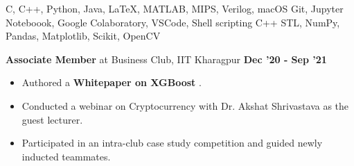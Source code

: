 \documentclass[10pt]{article}
\begin{document}
\vspace{-1.5ex}
{\color{headliner} \spacedhrule{0.15ex}{1.0ex}}
\begingroup
    \fontsize{10pt}{12pt}\selectfont
    \vspace{-0.7ex}
	{C,\hspace{0.75ex} 
	C++,\hspace{0.75ex}  Python,\hspace{0.75ex}
	Java, \hspace{0.75ex}
	LaTeX, \hspace{0.75ex}
	MATLAB, \hspace{0.75ex}
	MIPS, \hspace{0.75ex}
	Verilog, \hspace{0.75ex}
	macOS}
	\vspace{-0.7ex}
	{Git,\hspace{0.75ex} Jupyter Noteboook,\hspace{0.75ex} Google Colaboratory,\hspace{0.75ex} VSCode,\hspace{0.75ex} Shell scripting}
	\vspace{-0.7ex}
    {C++ STL,\hspace{0.75ex} NumPy,\hspace{0.75ex} Pandas,\hspace{0.75ex} Matplotlib,\hspace{0.75ex} Scikit,\hspace{0.75ex} OpenCV}
\endgroup

\vspace{-0.1ex}
{\color{headliner} \spacedhrule{0.15ex}{2.0ex}}
\vspace{-1ex}
\large { \textbf{Associate Member} at Business Club, IIT Kharagpur} \normalsize
{\hfill} \textbf{Dec '20 - Sep '21}\\[-1.8em]
\begin{itemize}
    \item Authored a \textbf{Whitepaper on XGBoost} {\href{https://drive.google.com/file/d/1e6BMMkBewwBbj1vg58pLpTyw0jNMvRba/view?usp=sharing}{\faDropbox}}. \\[-2em]
    \item Conducted a webinar on Cryptocurrency with Dr. Akshat Shrivastava as the guest lecturer. \\[-2em]
    \item Participated in an intra-club case study competition and guided newly inducted teammates.\\[-2em]

\end{itemize}
\end{document}
